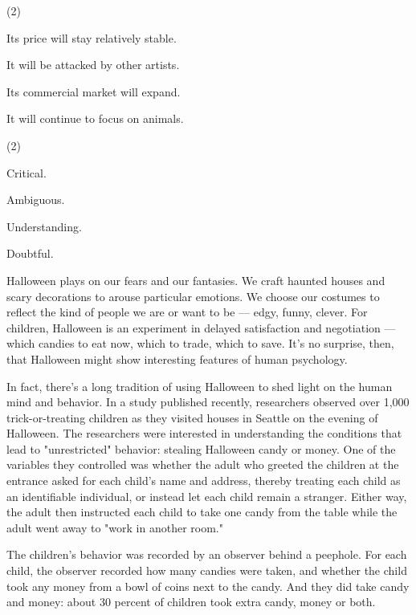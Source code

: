 \documentclass{英语试卷}
\begin{document}
\begin{choices}(2)
  \item Its price will stay relatively stable.
  \item It will be attacked by other artists.
  \item Its commercial market will expand.
  \item It will continue to focus on animals.
\end{choices}
\begin{choices}(2)
  \item Critical.
  \item Ambiguous.
  \item Understanding.
  \item Doubtful.
\end{choices}
\par Halloween plays on our fears and our fantasies. We craft haunted houses and scary decorations to arouse particular emotions. We choose our costumes to reflect the kind of people we are or want to be — edgy, funny, clever. For children, Halloween is an experiment in delayed satisfaction and negotiation — which candies to eat now, which to trade, which to save. It's no surprise, then, that Halloween might show interesting features of human psychology.\par
\par In fact, there's a long tradition of using Halloween to shed light on the human mind and behavior. In a study published recently, researchers observed over 1,000 trick-or-treating children as they visited houses in Seattle on the evening of Halloween. The researchers were interested in understanding the conditions that lead to "unrestricted" behavior: stealing Halloween candy or money. One of the variables they controlled was whether the adult who greeted the children at the entrance asked for each child's name and address, thereby treating each child as an identifiable individual, or instead let each child remain a stranger. Either way, the adult then instructed each child to take one candy from the table while the adult went away to "work in another room."\par
\par The children's behavior was recorded by an observer behind a peephole. For each child, the observer recorded how many candies were taken, and whether the child took any money from a bowl of coins next to the candy. And they did take candy and money: about 30 percent of children took extra candy, money or both.\par
\end{document}
